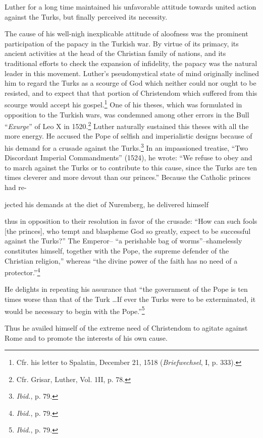 Luther for a long time maintained his unfavorable attitude
towards united action against the Turks, but finally perceived its
necessity.

The cause of his well-nigh inexplicable attitude of aloofness was
the prominent participation of the papacy in the Turkish war. By
virtue of its primacy, its ancient activities at the head of the Christian
family of nations, and its traditional efforts to check the expansion
of infidelity, the papacy was the natural leader in this movement.
Luther’s pseudomystical state of mind originally inclined him to regard
the Turks as a scourge of God which neither could nor ought to
be resisted, and to expect that that portion of Christendom which
suffered from this scourge would accept his gospel.\footnote{Cfr. his letter to Spalatin, December 21, 1518 (\textit{Briefwechsel}, I, p. 333).}
One of his
theses, which was formulated in opposition to the Turkish wars, was
condemned among other errors in the Bull “\textit{Exurge}” of Leo X in
1520.\footnote{Cfr. Grisar, Luther, Vol. 1II, p. 78.}
Luther naturally sustained this theses with all the more energy.
He accused the Pope of selfish and imperialistic designs because of
his demand for a crusade against the Turks.\footnote{\textit{Ibid.}, p. 79.}
In an impassioned
treatise, “Two Discordant Imperial Commandments” (1524), he
wrote: “We refuse to obey and to march against the Turks or to
contribute to this cause, since the Turks are ten times cleverer and
more devout than our princes.” Because the Catholic princes had re-

jected his demands at the diet of Nuremberg, he delivered himself

thus in opposition to their resolution in favor of the crusade: “How
can such fools [the princes], who tempt and blaspheme God so
greatly, expect to be successful against the Turks?” The Emperor--
“a perishable bag of worms”--shamelessly constitutes himself, together
with the Pope, the supreme defender of the Christian religion,”
whereas “the divine power of the faith has no need of a protector.”\footnote{\textit{Ibid.}, p. 79.}

He delights in repeating his assurance that “the government of the
Pope is ten times worse than that of the Turk \dots If ever the Turks
were to be exterminated, it would be necessary to begin with the
Pope.”\footnote{\textit{Ibid.}, p. 79.}


Thus he availed himself of the extreme need of Christendom to
agitate against Rome and to promote the interests of his own cause.

